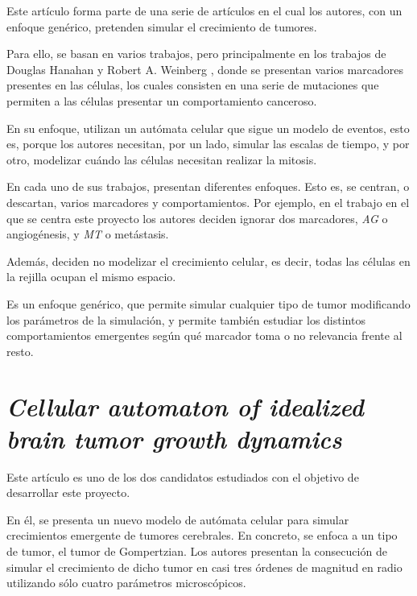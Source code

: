 Este artículo \cite{jsantos-amonteagudo-1-2014} forma parte de una serie de artículos
\cite{jsantos-amonteagudo-2012} \cite{jsantos-amonteagudo-2013} \cite{jsantos-amonteagudo-2015}
en el cual los autores, con un enfoque genérico, pretenden simular el crecimiento de
tumores.

Para ello, se basan en varios trabajos, pero principalmente en los trabajos de Douglas Hanahan y Robert A. Weinberg
\cite{hanahan-weinberg-2000} \cite{hanahan-weinberg-2011}, donde se presentan varios marcadores presentes
en las células, los cuales consisten en una serie de mutaciones que permiten a las células presentar
un comportamiento canceroso.

En su enfoque, utilizan un autómata celular que sigue un modelo de eventos, esto es, porque los autores
necesitan, por un lado, simular las escalas de tiempo, y por otro, modelizar cuándo las células necesitan
realizar la mitosis.

En cada uno de sus trabajos, presentan diferentes enfoques. Esto es, se centran, o descartan, varios marcadores y
comportamientos. Por ejemplo, en el trabajo en el que se centra este proyecto \cite{jsantos-amonteagudo-1-2014}
los autores deciden ignorar dos marcadores, \textit{AG} o angiogénesis, y \textit{MT} o metástasis.

Además, deciden no modelizar el crecimiento celular, es decir, todas las células en la rejilla ocupan
el mismo espacio.

Es un enfoque genérico, que permite simular cualquier tipo de tumor modificando los parámetros de la
simulación, y permite también estudiar los distintos comportamientos emergentes según
qué marcador toma o no relevancia frente al resto.

\section{\textit{Cellular automaton of idealized brain tumor growth dynamics}}

Este artículo \cite{kansal-torquato} es uno de los dos candidatos estudiados con el objetivo
de desarrollar este proyecto.

En él, se presenta un nuevo modelo de autómata celular para simular crecimientos emergente de tumores cerebrales.
En concreto, se enfoca a un tipo de tumor, el tumor de Gompertzian. Los autores presentan
la consecución de simular el crecimiento de dicho tumor en casi tres órdenes de magnitud en radio
utilizando sólo cuatro parámetros microscópicos.

